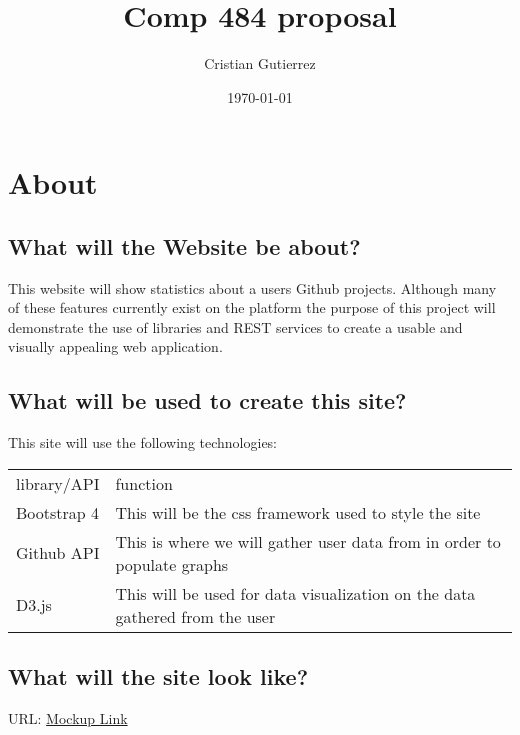 \documentclass[11pt]{article}
\author{Cristian Gutierrez}
\date{\today}
\title{Comp 484 proposal}
\begin{document}
\maketitle
\setcounter{tocdepth}{2}
\tableofcontents


\section*{About}
\label{sec:org75e7480}
\subsection*{What will the Website be about?}
\label{sec:org2b4c9b5}
This website will show statistics about a users Github projects. Although many
of these features currently exist on the platform the purpose of this project 
will demonstrate the use of libraries and REST services to create a usable and
visually appealing web application.
\subsection*{What will be used to create this site?}
\label{sec:org8ec2b69}
This site will use the following technologies:
\begin{center}
\begin{tabular}{ll}
library/API & function\\
Bootstrap 4 & This will be the css framework used to style the site\\
Github API & This is where we will gather user data from in order to populate graphs\\
D3.js & This will be used for data visualization on the data gathered from the user\\
\end{tabular}
\end{center}
\subsection*{What will the site look like?}
\label{sec:orgda27fc2}
URL: \href{https://www.figma.com/file/cxFmkghaHRQdt9WAdStWqy/Comp-484-Final-Project-Sample?node-id=0:1}{Mockup Link}
\end{document}
